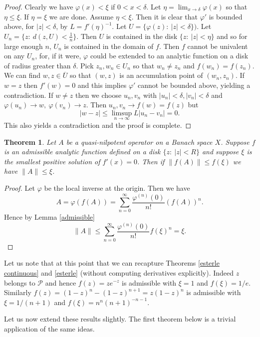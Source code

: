 \documentclass[12pt]{amsart}
\newtheorem{thm}{Theorem}[section]
\begin{document}
\begin{proof} Clearly we have $\varphi(x)<\xi$ if $0<x<\delta$.  Let
$\eta=\lim_{x\to \delta}\varphi(x)$ so that $\eta\le \xi$. If
$\eta=\xi$ we are done. Assume $\eta<\xi$. Then it is clear that
$\varphi'$ is bounded above, for $|z|<\delta$, by
$L=f'(\eta)^{-1}$. Let $U=\{\varphi(z):\ |z|<\delta\})$. Let
$U_n=\{z:\ d(z,U)<\frac1n\}$. Then $U$ is contained in the disk
$\{z:\ |z|<\eta\}$ and so for large enough $n$, $U_n$ is contained
in the domain of $f$.  Then $f$ cannot be univalent on any $U_n$,
for, if it were, $\varphi$ could be extended to an analytic
function on a disk of radius greater than $\delta$.  Pick
$z_n,w_n\in U_n$ so that $w_n\neq z_n$ and $f(w_n)=f(z_n)$.   We
can find $w,z\in \overline{U}$ so that $(w,z)$ is an accumulation
point of $(w_n,z_n)$.  If $w=z$ then $f'(w)=0$ and this implies
$\varphi'$ cannot be bounded above, yielding a contradiction.  If
$w\neq z$ then we choose $u_n,v_n$ with $|u_n|<\delta,
|v_n|<\delta$ and $\varphi(u_n)\to w,\ \varphi(v_n)\to z$.  Then
$u_n,v_n\to f(w)=f(z)$ but
$$ |w-z|\le \limsup_{n\to\infty}L|u_n-v_n|=0.$$  This also yields
a contradiction and the proof is complete.\end{proof}

\begin{thm}\label{nilpotent}  Let $A$ be a quasi-nilpotent operator on a Banach
space $X$.  Suppose $f$ is an admissible analytic function defined
on a disk $\{z:\ |z|<R\}$ and suppose $\xi$ is the smallest
positive solution of $f'(x)=0$.  Then if $\|f(A)\|\le f(\xi)$ we
have $\|A\|\le\xi$.\end{thm}

\begin{proof} Let $\varphi$ be the local inverse at the origin.
Then we have
$$
A=\varphi(f(A))=\sum_{n=0}^{\infty}\frac{\varphi^{(n)}(0)}{n!}(f(A))^n.$$
Hence by Lemma \ref{admissible}
$$ \|A\|\le
\sum_{n=0}^{\infty}\frac{\varphi^{(n)}(0)}{n!}f(\xi)^n=\xi.$$
\end{proof}

Let us note that at this point that we can recapture Theorems
\ref{esterle continuous} and \ref{esterle} (without computing
derivatives explicitly).  Indeed $z$ belongs to $\mathcal P$ and
hence $f(z)=ze^{-z}$ is admissible with $\xi=1$ and $f(\xi)=1/e$.
Similarly $ f(z)=(1-z)^n-(1-z)^{n+1}=z(1-z)^n$ is admissible with
$\xi=1/(n+1)$ and $f(\xi)=n^n(n+1)^{-n-1}$.

Let us now extend these results slightly.  The first theorem below
is a trivial application of the same ideas.
\end{document}
